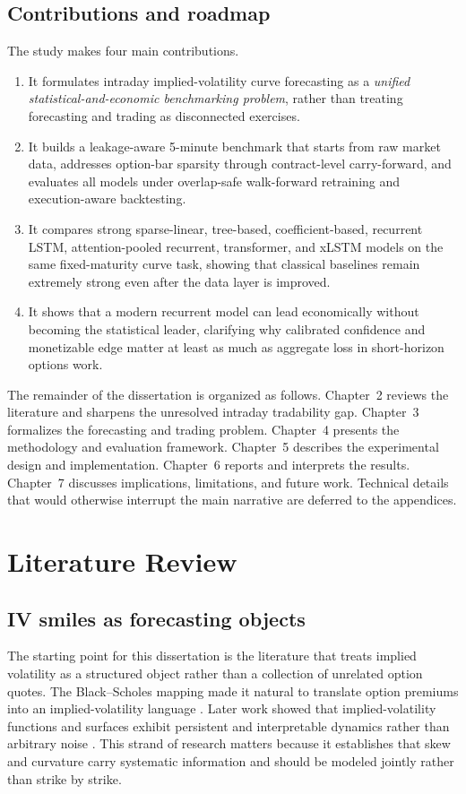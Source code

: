 \documentclass[12pt]{report}
\begin{document}
\section{Contributions and roadmap}
The study makes four main contributions.
\begin{enumerate}[leftmargin=1.3cm]
    \item It formulates intraday implied-volatility curve forecasting as a \emph{unified statistical-and-economic benchmarking problem}, rather than treating forecasting and trading as disconnected exercises.
    \item It builds a leakage-aware 5-minute benchmark that starts from raw market data, addresses option-bar sparsity through contract-level carry-forward, and evaluates all models under overlap-safe walk-forward retraining and execution-aware backtesting.
    \item It compares strong sparse-linear, tree-based, coefficient-based, recurrent LSTM, attention-pooled recurrent, transformer, and xLSTM models on the same fixed-maturity curve task, showing that classical baselines remain extremely strong even after the data layer is improved.
    \item It shows that a modern recurrent model can lead economically without becoming the statistical leader, clarifying why calibrated confidence and monetizable edge matter at least as much as aggregate loss in short-horizon options work.
\end{enumerate}

The remainder of the dissertation is organized as follows. Chapter~2 reviews the literature and sharpens the unresolved intraday tradability gap. Chapter~3 formalizes the forecasting and trading problem. Chapter~4 presents the methodology and evaluation framework. Chapter~5 describes the experimental design and implementation. Chapter~6 reports and interprets the results. Chapter~7 discusses implications, limitations, and future work. Technical details that would otherwise interrupt the main narrative are deferred to the appendices.

\chapter{Literature Review}

\section{IV smiles as forecasting objects}
The starting point for this dissertation is the literature that treats implied volatility as a structured object rather than a collection of unrelated option quotes. The Black--Scholes mapping made it natural to translate option premiums into an implied-volatility language \citep{black1973}. Later work showed that implied-volatility functions and surfaces exhibit persistent and interpretable dynamics rather than arbitrary noise \citep{dumas1998,cont2002dynamics}. This strand of research matters because it establishes that skew and curvature carry systematic information and should be modeled jointly rather than strike by strike.
\end{document}
